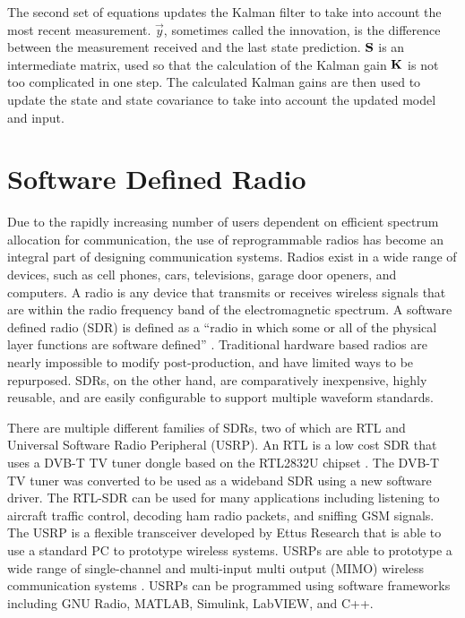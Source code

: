 The second set of equations updates the Kalman filter to take into account the most recent measurement. $\vec{y}$, sometimes called the innovation, is the difference between the measurement received and the last state prediction. 
$\mathbf{S}$ is an intermediate matrix, used so that the calculation of the Kalman gain $\mathbf{K}$ is not too complicated in one step. The calculated Kalman gains are then used to update the state and state covariance to take into account the updated model and input. \par

\section{Software Defined Radio}\label{back:sdr}
Due to the rapidly increasing number of users dependent on efficient spectrum allocation for communication, the use of reprogrammable radios has become an integral part of designing communication systems. Radios exist in a wide range of devices, such as cell phones, cars, televisions, garage door openers, and computers. A radio is any device that transmits or receives wireless signals that are within the radio frequency band of the electromagnetic spectrum. A software defined radio (SDR) is defined as a “radio in which some or all of the physical layer functions are software defined” \cite{sdr_forum}. Traditional hardware based radios are nearly impossible to modify post-production, and have limited ways to be repurposed. SDRs, on the other hand, are comparatively inexpensive, highly reusable, and are easily configurable to support multiple waveform standards.\par
There are multiple different families of SDRs, two of which are RTL and Universal Software Radio Peripheral (USRP). An RTL is a low cost SDR that uses a DVB-T TV tuner dongle based on the RTL2832U chipset \cite{rtl_sdr}. The DVB-T TV tuner was converted to be used as a wideband SDR using a new software driver. The RTL-SDR can be used for many applications including listening to aircraft traffic control, decoding ham radio packets, and sniffing GSM signals. The USRP is a flexible transceiver developed by Ettus Research that is able to use a standard PC to prototype wireless systems. USRPs are able to prototype a wide range of single-channel and multi-input multi output (MIMO) wireless communication systems \cite{USRP_NI}. USRPs can be programmed using software frameworks including GNU Radio, MATLAB, Simulink, LabVIEW, and C++.\par

